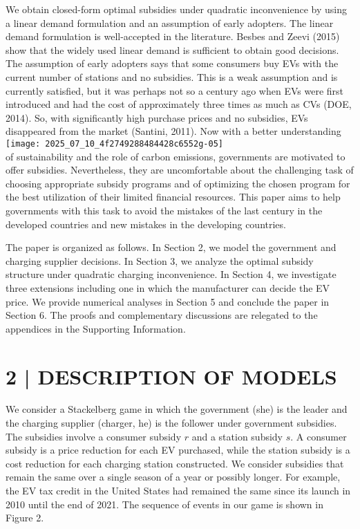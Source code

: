 \documentclass[10pt]{article}
\begin{document}
We obtain closed-form optimal subsidies under quadratic inconvenience by using a linear demand formulation and an assumption of early adopters. The linear demand formulation is well-accepted in the literature. Besbes and Zeevi (2015) show that the widely used linear demand is sufficient to obtain good decisions. The assumption of early adopters says that some consumers buy EVs with the current number of stations and no subsidies. This is a weak assumption and is currently satisfied, but it was perhaps not so a century ago when EVs were first introduced and had the cost of approximately three times as much as CVs (DOE, 2014). So, with significantly high purchase prices and no subsidies, EVs disappeared from the market (Santini, 2011). Now with a better understanding\\
\texttt{[image: 2025\_07\_10\_4f2749288484428c6552g-05]}\\
of sustainability and the role of carbon emissions, governments are motivated to offer subsidies. Nevertheless, they are uncomfortable about the challenging task of choosing appropriate subsidy programs and of optimizing the chosen program for the best utilization of their limited financial resources. This paper aims to help governments with this task to avoid the mistakes of the last century in the developed countries and new mistakes in the developing countries.

The paper is organized as follows. In Section 2, we model the government and charging supplier decisions. In Section 3, we analyze the optimal subsidy structure under quadratic charging inconvenience. In Section 4, we investigate three extensions including one in which the manufacturer can decide the EV price. We provide numerical analyses in Section 5 and conclude the paper in Section 6. The proofs and complementary discussions are relegated to the appendices in the Supporting Information.

\section*{2 | DESCRIPTION OF MODELS}
We consider a Stackelberg game in which the government (she) is the leader and the charging supplier (charger, he) is the follower under government subsidies. The subsidies involve a consumer subsidy $r$ and a station subsidy $s$. A consumer subsidy is a price reduction for each EV purchased, while the station subsidy is a cost reduction for each charging station constructed. We consider subsidies that remain the same over a single season of a year or possibly longer. For example, the EV tax credit in the United States had remained the same since its launch in 2010 until the end of 2021. The sequence of events in our game is shown in Figure 2.
\end{document}
